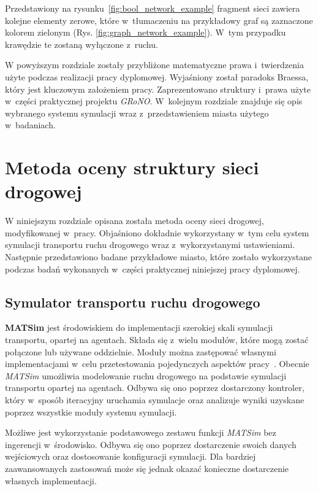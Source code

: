 \documentclass[twoside,12pt]{report}
\let\oldsection\chapter
\def\chapter{\cleardoublepage\oldsection}
\begin{document}
Przedstawiony na rysunku~\ref{fig:bool_network_example} fragment sieci zawiera kolejne elementy zerowe, które w~tłumaczeniu na przykładowy graf są zaznaczone kolorem zielonym (Rys. \ref{fig:graph_network_example}). W~tym przypadku krawędzie te zostaną wyłączone z~ruchu.
\newline

W powyższym rozdziale zostały przybliżone matematyczne prawa i~twierdzenia użyte podczas realizacji pracy dyplomowej. Wyjaśniony został paradoks Braessa, który jest kluczowym założeniem pracy. Zaprezentowano struktury i~prawa użyte w~części praktycznej projektu \textit{GRoNO}. W~kolejnym rozdziale znajduje się opis wybranego systemu symulacji wraz z~przedstawieniem miasta użytego w~badaniach.

\chapter{Metoda oceny struktury sieci drogowej}\label{rozdz.technologie} 
W niniejszym rozdziale opisana została metoda oceny sieci drogowej, modyfikowanej w~pracy. Objaśniono dokładnie wykorzystany w~tym celu system symulacji transportu ruchu drogowego wraz z~wykorzystanymi ustawieniami. Następnie przedstawiono badane przykładowe miasto, które zostało wykorzystane podczas badań wykonanych w~części praktycznej niniejszej pracy dyplomowej.

\section{Symulator transportu ruchu drogowego}
\textbf{MATSim} jest środowiskiem do implementacji szerokiej skali symulacji transportu, opartej na agentach. Składa się z~wielu modułów, które mogą zostać połączone lub używane oddzielnie. Moduły można zastępować własnymi implementacjami w~celu przetestowania pojedynczych aspektów pracy~\cite{matsim}. Obecnie \textit{MATSim} umożliwia modelowanie ruchu drogowego na podstawie symulacji transportu opartej na agentach. Odbywa się ono poprzez dostarczony kontroler, który w~sposób iteracyjny uruchamia symulacje oraz analizuje wyniki uzyskane poprzez wszystkie moduły systemu symulacji.

Możliwe jest wykorzystanie podstawowego zestawu funkcji \textit{MATSim} bez ingerencji w~środowisko. Odbywa się ono poprzez dostarczenie swoich danych wejściowych oraz dostosowanie konfiguracji symulacji. Dla bardziej zaawansowanych zastosowań może się jednak okazać konieczne dostarczenie własnych implementacji.
\end{document}

